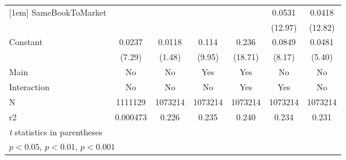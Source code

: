 {\begin{tabular}{l*{6}{c}}
[1em]
SameBookToMarket    &                     &                     &                     &                     &      0.0531\sym{***}&      0.0418\sym{***}\\
                    &                     &                     &                     &                     &     (12.97)         &     (12.82)         \\
[1em]
Constant            &      0.0237\sym{***}&      0.0118         &       0.114\sym{***}&       0.236\sym{***}&      0.0849\sym{***}&      0.0481\sym{***}\\
                    &      (7.29)         &      (1.48)         &      (9.95)         &     (18.71)         &      (8.17)         &      (5.40)         \\
\hline
Main                &          No         &          No         &         Yes         &         Yes         &          No         &          No         \\
Interaction         &          No         &          No         &          No         &         Yes         &         Yes         &          No         \\
N                   &     1111129         &     1073214         &     1073214         &     1073214         &     1073214         &     1073214         \\
r2                  &    0.000473         &       0.226         &       0.235         &       0.240         &       0.234         &       0.231         \\
\hline\hline
\multicolumn{7}{l}{\footnotesize \textit{t} statistics in parentheses}\\
\multicolumn{7}{l}{\footnotesize \sym{*} \(p<0.05\), \sym{**} \(p<0.01\), \sym{***} \(p<0.001\)}\\
\end{tabular}
}
